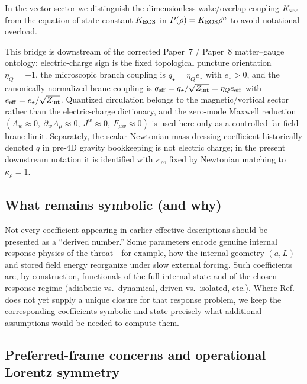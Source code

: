 \documentclass[11pt]{article}
\newcommand{\etaQ}{\eta_Q}
\newcommand{\estar}{e_\star}
\newcommand{\qstar}{q_\star}
\newcommand{\eeff}{e_{\rm eff}}
\newcommand{\qeff}{q_{\rm eff}}
\begin{document}
In the vector sector we distinguish the dimensionless wake/overlap coupling $K_{\rm vec}$ from the
equation-of-state constant $K_{\rm EOS}$ in $P(\rho)=K_{\rm EOS}\rho^n$ to avoid notational
overload.

This bridge is downstream of the corrected Paper~7 / Paper~8 matter--gauge ontology: electric-charge sign is the fixed topological puncture orientation \(\etaQ=\pm1\), the microscopic branch coupling is \(\qstar=\etaQ\estar\) with \(\estar>0\), and the canonically normalized brane coupling is \(\qeff=\qstar/\sqrt{Z_{\rm int}}=\etaQ\eeff\) with \(\eeff=\estar/\sqrt{Z_{\rm int}}\). Quantized circulation belongs to the magnetic/vortical sector rather than the electric-charge dictionary, and the zero-mode Maxwell reduction \((A_w\approx 0,\ \partial_w A_\mu\approx 0,\ J^w\approx 0,\ F_{\mu w}\approx 0)\) is used here only as a controlled far-field brane limit. Separately, the scalar Newtonian mass-dressing coefficient historically denoted $q$ in pre-4D gravity bookkeeping is not electric charge; in the present downstream notation it is identified with $\kappa_\rho$, fixed by Newtonian matching to $\kappa_\rho=1$.

\subsection{What remains symbolic (and why)}

Not every coefficient appearing in earlier effective descriptions should be presented as a
``derived number.'' Some parameters encode genuine internal response physics of the throat---for
example, how the internal geometry $(a,L)$ and stored field energy reorganize under slow external
forcing. Such coefficients are, by construction, functionals of the full internal state and of
the chosen response regime (adiabatic vs.\ dynamical, driven vs.\ isolated, etc.). Where Ref.~\cite{norris2026_4d_model}
does not yet supply a unique closure for that response problem, we keep the corresponding
coefficients symbolic and state precisely what additional assumptions would be needed to compute
them.

\subsection{Preferred-frame concerns and operational Lorentz symmetry}
\end{document}
